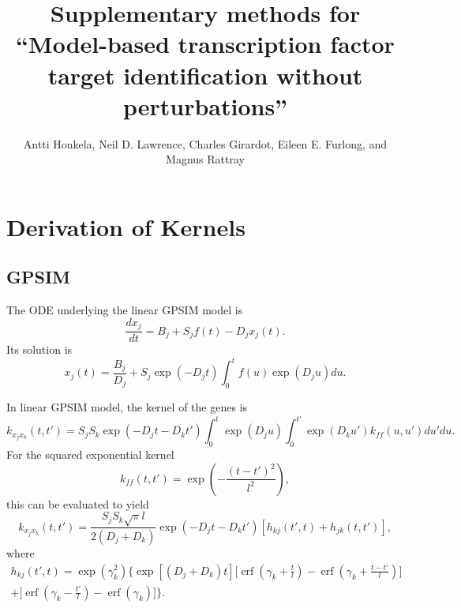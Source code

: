 \documentclass{article}
\title{Supplementary methods for ``Model-based transcription factor
  target identification without perturbations''}
\author{
Antti Honkela,
Neil D. Lawrence,
Charles Girardot, 
Eileen E. Furlong, and
Magnus Rattray
}
\newcommand{\erf}{\operatorname{erf}}
\begin{document}
\maketitle


\section{Derivation of Kernels}

\subsection{GPSIM}

The ODE underlying the linear GPSIM model is
\begin{equation}
  \label{eq:gpsim_ode}
  \frac{dx_j}{dt} = B_j + S_j f(t) - D_j x_j(t).
\end{equation}
Its solution is
\begin{equation}
  \label{eq:gpsim_ode_sol}
  x_j(t) = \frac{B_j}{D_j} + S_j \exp(-D_j t) \int_0^t f(u) \exp(D_j
  u) du.
\end{equation}

In linear GPSIM model, the kernel of the genes is
\begin{equation}
  \label{eq:gpsim_genekernel0}
  k_{x_j x_k}(t, t') = S_j S_k \exp(-D_j t - D_k t') \int_0^t \exp(D_j
  u)
  \int_0^{t'} \exp(D_k u') k_{ff}(u, u') du' du.
\end{equation}
For the squared exponential kernel
\begin{equation}
  \label{eq:sqexp_kernel}
  k_{ff}(t, t') = \exp\left( -\frac{(t-t')^2}{l^2} \right),
\end{equation}
this can be evaluated to yield
\begin{equation}
  \label{eq:gpsim_genekernel}
  k_{x_j x_k}(t, t') = \frac{S_j S_k \sqrt{\pi}l}{2(D_j + D_k)}
  \exp(-D_j t -D_k t') [ h_{kj}(t', t) +
  h_{jk}(t, t')],
\end{equation}
where
\begin{multline}
  \label{eq:gpsim_h}
  h_{kj}(t', t) = \exp(\gamma_k^2)
  \bigg\{ \exp[(D_j + D_k) t ] \bigg[
       \erf\left(\gamma_k + \frac{t}{l} \right) - 
       \erf\left(\gamma_k + \frac{t-t'}{l} \right) \bigg] \\
  + \bigg[
       \erf\left(\gamma_k - \frac{t'}{l} \right) -
       \erf\left(\gamma_k \right) \bigg] \bigg\}.
\end{multline}
\end{document}
